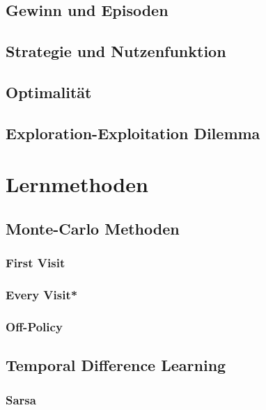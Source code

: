 \documentclass[12pt]{article}
\numberwithin{equation}{section}
\begin{document}
	\subsection{Gewinn und Episoden}
	

	\subsection{Strategie und Nutzenfunktion}
	

	\subsection{Optimalität}
	

	\subsection{Exploration-Exploitation Dilemma}
	

\section{Lernmethoden}
	\subsection{Monte-Carlo Methoden}
	
		\subsubsection{First Visit}
		
		\pagebreak
		\subsubsection{Every Visit*}
		\subsubsection{Off-Policy}

	\subsection{Temporal Difference Learning}
	
		\subsubsection{Sarsa}
		
		\pagebreak
\end{document}
